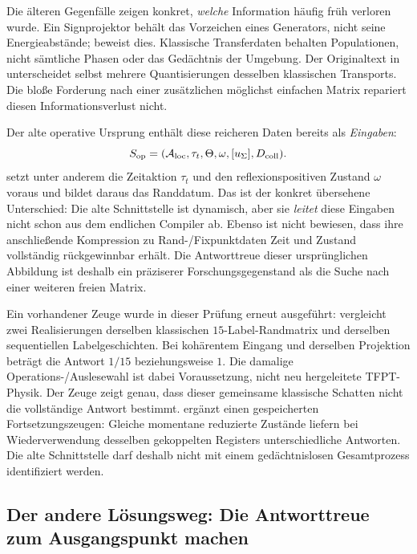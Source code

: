 Die älteren Gegenfälle zeigen konkret, \emph{welche} Information häufig früh verloren wurde. Ein Signprojektor behält das Vorzeichen eines Generators, nicht seine Energieabstände;  beweist dies. Klassische Transferdaten behalten Populationen, nicht sämtliche Phasen oder das Gedächtnis der Umgebung. Der Originaltext in  unterscheidet selbst mehrere Quantisierungen desselben klassischen Transports. Die bloße Forderung nach einer zusätzlichen möglichst einfachen Matrix repariert diesen Informationsverlust nicht.

Der alte operative Ursprung enthält diese reicheren Daten bereits als \emph{Eingaben}:
\[
 S_{\rm op}=(\mathcal A_{\rm loc},\tau_t,\Theta,\omega,[u_\Sigma],D_{\rm coll}).
\]
 setzt unter anderem die Zeitaktion $\tau_t$ und den reflexionspositiven Zustand $\omega$ voraus und bildet daraus das Randdatum. Das ist der konkret übersehene Unterschied: Die alte Schnittstelle ist dynamisch, aber sie \emph{leitet} diese Eingaben nicht schon aus dem endlichen Compiler ab. Ebenso ist nicht bewiesen, dass ihre anschließende Kompression zu Rand-/Fixpunktdaten Zeit und Zustand vollständig rückgewinnbar erhält. Die Antworttreue dieser ursprünglichen Abbildung ist deshalb ein präziserer Forschungsgegenstand als die Suche nach einer weiteren freien Matrix.

Ein vorhandener Zeuge wurde in dieser Prüfung erneut ausgeführt:  vergleicht zwei Realisierungen derselben klassischen $15$-Label-Randmatrix und derselben sequentiellen Labelgeschichten. Bei kohärentem Eingang und derselben Projektion beträgt die Antwort $1/15$ beziehungsweise $1$. Die damalige Operations-/Auslesewahl ist dabei Voraussetzung, nicht neu hergeleitete TFPT-Physik. Der Zeuge zeigt genau, dass dieser gemeinsame klassische Schatten nicht die vollständige Antwort bestimmt.  ergänzt einen gespeicherten Fortsetzungszeugen: Gleiche momentane reduzierte Zustände liefern bei Wiederverwendung desselben gekoppelten Registers unterschiedliche Antworten. Die alte Schnittstelle darf deshalb nicht mit einem gedächtnislosen Gesamtprozess identifiziert werden.

\subsection*{Der andere Lösungsweg: Die Antworttreue zum Ausgangspunkt machen}

